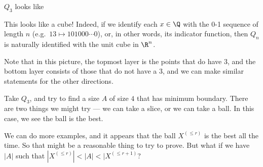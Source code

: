 \documentclass[a4paper]{article}
\begin{document}
\begin{eg}
  $Q_3$ looks like
  \begin{center}
  \end{center}
\end{eg}
This looks like a cube! Indeed, if we identify each $x \in \Q$ with the 0-1 sequence of length $n$ (e.g.\ $13 \mapsto 101000\cdots 0$), or, in other words, its indicator function, then $Q_n$ is naturally identified with the unit cube in $\R^n$.
\begin{center}
\end{center}
Note that in this picture, the topmost layer is the points that do have $3$, and the bottom layer consists of those that do not have a $3$, and we can make similar statements for the other directions.

\begin{eg}
  Take $Q_3$, and try to find a size $A$ of size $4$ that has minimum boundary. There are two things we might try --- we can take a slice, or we can take a ball. In this case, we see the ball is the best.
\end{eg}
We can do more examples, and it appears that the ball $X^{(\leq r)}$ is the best all the time. So that might be a reasonable thing to try to prove. But what if we have $|A|$ such that $|X^{(\leq r)}| < |A| < |X^{(\leq r + 1)}$?
\end{document}
